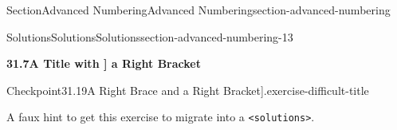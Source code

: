 \documentclass[twoside,10pt,]{article}
\newcommand{\mono}[1]{\texttt{#1}}
\numberwithin{equation}{section}
\begin{document}
\begin{sectionptx}{Section}{Advanced Numbering}{}{Advanced Numbering}{}{}{section-advanced-numbering}
\begin{solutions-subsection}{Solutions}{Solutions}{}{Solutions}{}{}{section-advanced-numbering-13}
\begin{introduction}{}
\end{introduction}%
\par\medskip
\noindent\textbf{\normalsize{}31.7\space\textperiodcentered\space{}A Title with ] a Right Bracket}
\begin{inlinesolution}{Checkpoint}{31.19}{A Right Brace \textbraceright{} and a Right Bracket].}{exercise-difficult-title}%
\par\smallskip%
\noindent\hypertarget{exercise-difficult-title-3-main}{}A faux hint to get this exercise to migrate into a \mono{<solutions>}.%
\end{inlinesolution}%
\end{solutions-subsection}
\end{sectionptx}
%
%
\typeout{************************************************}
\typeout{************************************************}
%
\end{document}

